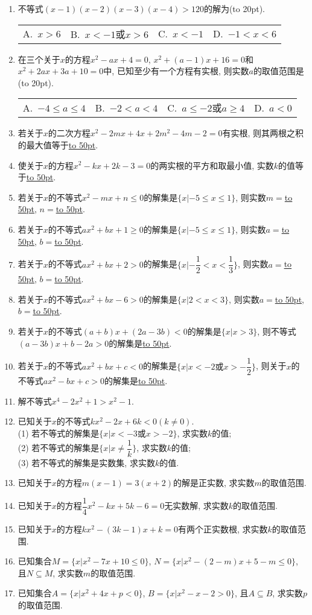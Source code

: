 \documentclass[10pt,a4paper]{article}
\newcommand{\blank}[1]{\underline{\hbox to #1pt{}}}
\newcommand{\bracket}[1]{(\hbox to #1pt{})}
\newcommand{\fourch}[4]{\par\begin{tabular}{p{.23\textwidth}p{.23\textwidth}p{.23\textwidth}p{.23\textwidth}}
A.~#1 &B.~#2& C.~#3& D.~#4
\end{tabular}}
\begin{document}
\begin{enumerate}[1.]
\fourch{$19$}{$18$}{$\dfrac{50}9$}{$-6$}
\item 不等式$(x-1)(x-2)(x-3)(x-4)>120$的解为\bracket{20}.
\fourch{$x>6$}{$x<-1$或$x>6$}{$x<-1$}{$-1<x<6$}
\item 在三个关于$x$的方程$x^2-ax+4=0$, $x^2+(a-1)x+16=0$和$x^2+2ax+3a+10=0$中, 已知至少有一个方程有实根, 则实数$a$的取值范围是\bracket{20}.
\fourch{$-4\le a\le 4$}{$-2<a<4$}{$a\le -2$或$a\ge 4$}{$a<0$}
\item 若关于$x$的二次方程$x^2-2mx+4x+2m^2-4m-2=0$有实根, 则其两根之积的最大值等于\blank{50}.
\item 使关于$x$的方程$x^2-kx+2k-3=0$的两实根的平方和取最小值, 实数$k$的值等于\blank{50}.
\item 若关于$x$的不等式$x^2-mx+n\le 0$的解集是$\{x|-5\le x\le 1\}$, 则实数$m=$\blank{50}, $n=$\blank{50}.
\item 若关于$x$的不等式$ax^2+bx+1\ge 0$的解集是$\{x|-5\le x\le 1\}$, 则实数$a=$\blank{50}, $b=$\blank{50}.
\item 若关于$x$的不等式$ax^2+bx+2>0$的解集是$\{x|-\dfrac 12<x<\dfrac 13\}$, 则实数$a=$\blank{50}, $b=$\blank{50}.
\item 若关于$x$的不等式$ax^2+bx-6>0$的解集是$\{x|2<x<3\}$, 则实数$a=$\blank{50}, $b=$\blank{50}.
\item 若关于$x$的不等式$(a+b)x+(2a-3b)<0$的解集是$\{x|x>3\}$, 则不等式$(a-3b)x+b-2a>0$的解集是\blank{50}.
\item 若关于$x$的不等式$ax^2+bx+c<0$的解集是$\{x|x<-2\text{或}x>-\dfrac 12\}$, 则关于$x$的不等式$ax^2-bx+c>0$的解集是\blank{50}.
\item 解不等式$x^4-2x^2+1>x^2-1$.
\item 已知关于$x$的不等式$kx^2-2x+6k<0(k\ne 0)$.\\
(1) 若不等式的解集是$\{x|x<-3\text{或}x>-2\}$, 求实数$k$的值;\\
(2) 若不等式的解集是$\{x|x\ne \dfrac 1k\}$, 求实数$k$的值;\\
(3) 若不等式的解集是实数集, 求实数$k$的值.
\item 已知关于$x$的方程$m(x-1)=3(x+2)$的解是正实数, 求实数$m$的取值范围.
\item 已知关于$x$的方程$\dfrac 14x^2-kx+5k-6=0$无实数解, 求实数$k$的取值范围.
\item 已知关于$x$的方程$kx^2-(3k-1)x+k=0$有两个正实数根, 求实数$k$的取值范围.
\item 已知集合$M=\{x|x^2-7x+10\le 0\}$, $N=\{x|x^2-(2-m)x+5-m\le 0\}$, 且$N\subseteq M$, 求实数$m$的取值范围.
\item 已知集合$A=\{x|x^2+4x+p<0\}$, $B=\{x|x^2-x-2>0\}$, 且$A\subseteq B$, 求实数$p$的取值范围.

\end{enumerate}
\end{document}

